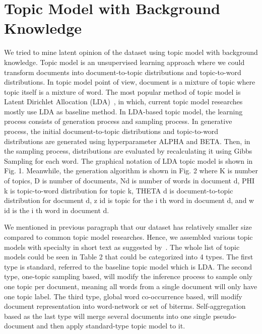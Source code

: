 \documentclass[senior]{IPSstyle}
\begin{document}
\section{Topic Model with Background Knowledge}

We tried to mine latent opinion of the dataset using topic model with background knowledge. Topic model is an unsupervised learning approach where we could transform documents into document-to-topic distributions and topic-to-word distributions. In topic model point of view, document is a mixture of topic where topic itself is a mixture of word. The most popular method of topic model is Latent Dirichlet Allocation (LDA)~\cite{blei}, in which, current topic model researches mostly use LDA as baseline method. In LDA-based topic model, the learning process consists of generation process and sampling process. In generative process, the initial document-to-topic distributions and topic-to-word distributions are generated using hyperparameter ALPHA and BETA. Then, in the sampling process, distributions are evaluated by recalculating it using Gibbs Sampling for each word. The graphical notation of LDA topic model is shown in Fig. 1. Meanwhile, the generation algorithm is shown in Fig. 2 where K is number of topics, D is number of documents, Nd is number of words in document d, PHI k is topic-to-word distribution for topic k, THETA d is document-to-topic distribution for document d, z id is topic for the i th word in document d, and w id is the i th word in document d.

We mentioned in previous paragraph that our dataset has relatively smaller size compared to common topic model researches. Hence, we assembled various topic models with specialty in short text as suggested by~\cite{qiang}. The whole list of topic models could be seen in Table 2 that could be categorized into 4 types. The first type is standard, referred to the baseline topic model which is LDA. The second type, one-topic sampling based, will modify the inference process to sample only one topic per document, meaning all words from a single document will only have one topic label. The third type, global word co-occurrence based, will modify document representation into word-network or set of biterms. Self-aggregation based as the last type will merge several documents into one single pseudo-document and then apply standard-type topic model to it.
\end{document}
